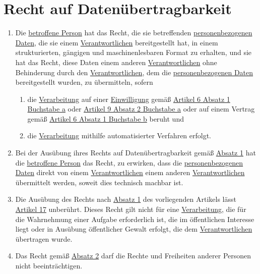\chapter{Recht auf Datenübertragbarkeit}
\label{ch:20}


\begin{enumerate}

  \item Die \hyperref[itm:04-1]{betroffene Person} hat das Recht, die sie betreffenden \hyperref[itm:04-1]{personenbezogenen Daten}, die sie einem
   \hyperref[itm:04-7]{Verantwortlichen} bereitgestellt hat, in einem strukturierten, gängigen und maschinenlesbaren Format zu erhalten, und
   sie hat das Recht, diese Daten einem anderen \hyperref[itm:04-7]{Verantwortlichen} ohne Behinderung durch den \hyperref[itm:04-7]{Verantwortlichen}, dem die
   \hyperref[itm:04-1]{personenbezogenen Daten} bereitgestellt wurden, zu übermitteln, sofern
  \label{itm:20-1}

  \begin{enumerate}
  
    \item die \hyperref[itm:04-2]{Verarbeitung} auf einer \hyperref[itm:04-11]{Einwilligung} gemäß \hyperref[itm:06-1a]{Artikel 6 Absatz 1 Buchstabe a} oder
    \hyperref[itm:09-2a]{Artikel 9 Absatz 2 Buchstabe a} oder auf einem Vertrag gemäß \hyperref[itm:06-1b]{Artikel 6
     Absatz 1 Buchstabe b} beruht und
  \label{itm:20-1a}

    \item die \hyperref[itm:04-2]{Verarbeitung} mithilfe automatisierter Verfahren erfolgt.
  \label{itm:20-1b}

  \end{enumerate}

  \item Bei der Ausübung ihres Rechts auf Datenübertragbarkeit gemäß \hyperref[itm:20-1]{Absatz 1} hat die \hyperref[itm:04-1]{betroffene
   Person} das Recht, zu erwirken, dass die \hyperref[itm:04-1]{personenbezogenen Daten} direkt von einem \hyperref[itm:04-7]{Verantwortlichen} einem anderen
   \hyperref[itm:04-7]{Verantwortlichen} übermittelt werden, soweit dies technisch machbar ist.
  \label{itm:20-2}

  \item Die Ausübung des Rechts nach \hyperref[itm:20-1]{Absatz 1} des vorliegenden Artikels lässt \hyperref[ch:17]
   {Artikel 17} unberührt. Dieses Recht gilt nicht für eine \hyperref[itm:04-2]{Verarbeitung}, die für die Wahrnehmung einer Aufgabe
   erforderlich ist, die im öffentlichen Interesse liegt oder in Ausübung öffentlicher Gewalt erfolgt, die dem
   \hyperref[itm:04-7]{Verantwortlichen} übertragen wurde.
  \label{itm:20-3}

  \item Das Recht gemäß \hyperref[itm:20-2]{Absatz 2} darf die Rechte und Freiheiten anderer Personen nicht
   beeinträchtigen.
  \label{itm:20-4}

\end{enumerate}


